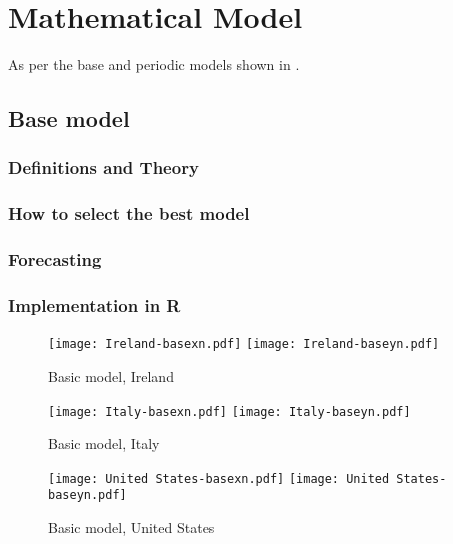 \section{Mathematical Model}
\label{ch:mathmodel}

As per the base and periodic models shown in \cite{grigor20}.

\subsection{Base model}

\subsubsection{Definitions and Theory}

\subsubsection{How to select the best model}

\subsubsection{Forecasting}

\subsubsection{Implementation in R}

\begin{figure}[H]
  \texttt{[image: Ireland-basexn.pdf]} \label{fig:ireland-basexn}
\endminipage\hfill
{}
  \texttt{[image: Ireland-baseyn.pdf]} \label{fig:ireland-baseyn}
\endminipage
\caption{Basic model, Ireland}
\end{figure}

\begin{figure}[H]
  \texttt{[image: Italy-basexn.pdf]} \label{fig:italy-basexn}
\endminipage\hfill
{}
  \texttt{[image: Italy-baseyn.pdf]} \label{fig:italy-baseyn}
\endminipage
\caption{Basic model, Italy}
\end{figure}

\begin{figure}[H]
  \texttt{[image: United States-basexn.pdf]} \label{fig:usa-basexn}
\endminipage\hfill
{}
  \texttt{[image: United States-baseyn.pdf]} \label{fig:usa-baseyn}
\endminipage
\caption{Basic model, United States}
\end{figure}

